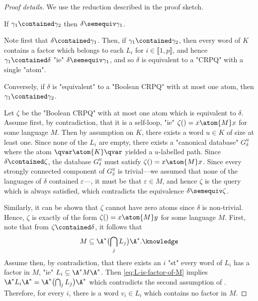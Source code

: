 \begin{proof}[Proof details]
	We use the reduction described in the proof sketch.
	
	\begin{claim}
		\AP\label{claim:minimization-lowerbound-1}
		If $\gamma_1 \contained \gamma_2$ then $\delta \semequiv \gamma_1$.
	\end{claim}
	Note first that $\delta \contained \gamma_1$.
	Then, if $\gamma_1 \contained \gamma_2$, then every word of $K$
	contains a factor which belongs to each $L_i$ for $i \in \lBrack 1, p\rBrack$,
	and hence $\gamma_1 \contained \delta$ "ie" $\delta \semequiv \gamma_1$,
	and so $\delta$ is equivalent to a "CRPQ" with a single "atom".

	\begin{claim}
		\AP\label{claim:minimization-lowerbound-2}
		Conversely, if $\delta$ is "equivalent" to a "Boolean CRPQ" with at most one atom,
		then $\gamma_1 \contained \gamma_2$.
	\end{claim}
	Let $\zeta$ be the "Boolean CRPQ" with at most one atom which is equivalent to $\delta$. Assume first, by contradiction, that it is a self-loop, "ie" $\zeta() = x \atom{M} x$ for some language $M$.
	Then by assumption on $K$, there exists a word $u\in K$ of size at least one.
	Since none of the $L_i$ are empty, there exists a "canonical database"
	$G_\delta^u$ where the atom
	$\qvar \atom{K} \qvar$ yielded a $u$-labelled path. Since $\delta \contained \zeta$,
	the database $G_\delta^u$ must satisfy $\zeta() = x \atom{M} x$.
	Since every strongly connected component of $G_\delta^u$ is trivial---we assumed that none of the languages
	of $\delta$ contained $\varepsilon$---, it must be that $\varepsilon \in M$, and hence $\zeta$
	is the query which is always satisfied, which contradicts the equivalence $\delta \semequiv \zeta$.

	Similarly, it can be shown that $\zeta$ cannot have zero atoms since $\delta$ is non-trivial. 
	Hence, $\zeta$ is exactly of the form $\zeta() = x \atom{M} y$ for some language $M$.
	First, note that from $\zeta \contained \delta$, it follows that
	\begin{equation}
		M \subseteq \A^* \bigl( \bigcap_j L_j \bigr) \A^*.
		\AP\label{eq:L-is-factor-of-M}
	\end{equation}
	Assume then, by contradiction, that there
	exists an $i$ "st" every word of $L_i$ has a factor in $M$,
	"ie" $L_i \subseteq \A^* M \A^*$. Then \eqref{eq:L-is-factor-of-M} implies
	$\A^* L_i \A^* = \A^* \bigl( \bigcap_j L_j \bigr) \A^*$ which contradicts
	the second assumption of .
	Therefore, for every $i$, there is a word $v_i \in L_i$ which contains no factor in $M$.
	

\end{proof}
